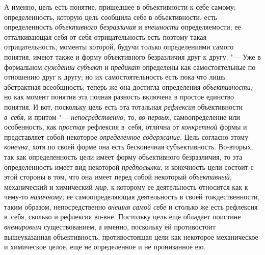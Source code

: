 А именно, цель есть понятие, пришедшее в объективности к себе
самому; определенность, которую цель сообщила себе в объективности, есть
определенность {\em объективного безразличия} и {\em внешности}
определяемости; ее отталкивающая себя от себя отрицательность
есть поэтому такая отрицательность, моменты которой, будучи только
определениями самого понятия, имеют также и форму объективного безразличия
друг к другу. "--- Уже в формальном
{\em суждении субъект} и {\em предикат} определены
как самостоятельные по отношению друг к другу; но их самостоятельность есть
пока что лишь абстрактная всеобщность; теперь же она достигла определения
{\em объективности;} но
как момент понятия эта полная разность включена в простое единство понятия.
И вот, поскольку цель есть эта тотальная {\em рефлексия}
объективности {\em в~себя}, и притом "--- {\em непосредственно},
то, {\em во-первых}, самоопределение или особенность, как
{\em простая} рефлексия в~себя, отлична от {\em конкретной}
формы и представляет собой некоторое {\em определенное содержание}.
Цель согласно этому {\em конечна}, хотя по
своей форме она есть бесконечная субъективность. Во-вторых, так как
определенность цели имеет форму объективного безразличия, то эта
определенность имеет вид некоторой {\em предпосылки}, и
конечность цели состоит с этой стороны в том, что она имеет перед собой
некоторый {\em объективный}, механический и химический {\em мир},
к которому ее деятельность относится как к чему-то {\em наличному;} ее
самоопределяющая деятельность в своей тождественности, таким образом,
непосредственно {\em внешня самой себе}
и столько же есть рефлексия в~себя, сколько и рефлексия
во-вне. Постольку цель еще обладает поистине {\em внемировым}
существованием, а именно, поскольку ей противостоит вышеуказанная
объективность, противостоящая цели как некоторое механическое и химическое
целое, еще не определенное и не пронизанное ею.

